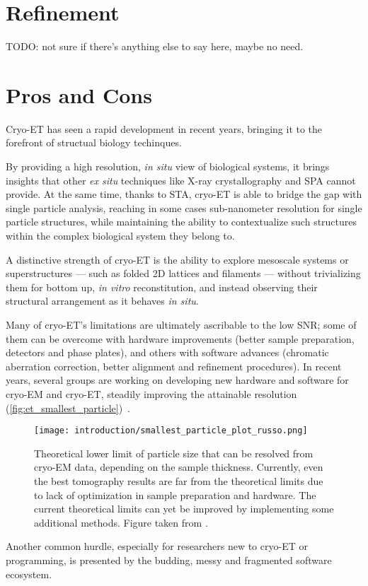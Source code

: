 \section{Refinement}\label{et_refinement}

TODO: not sure if there's anything else to say here, maybe no need.

\section{Pros and Cons}

Cryo-ET has seen a rapid development in recent years, bringing it to the forefront of structual biology techinques.

By providing a high resolution, \textit{in situ} view of biological systems, it brings insights that other \textit{ex situ} techniques like X-ray crystallography and SPA cannot provide.
At the same time, thanks to STA, cryo-ET is able to bridge the gap with single particle analysis, reaching in some cases sub-nanometer resolution for single particle structures, while maintaining the ability to contextualize such structures within the complex biological system they belong to.

A distinctive strength of cryo-ET is the ability to explore mesoscale systems or superstructures --- such as folded 2D lattices and filaments --- without trivializing them for bottom up, \textit{in vitro} reconstitution, and instead observing their structural arrangement as it behaves \textit{in situ}.

Many of cryo-ET's limitations are ultimately ascribable to the low SNR; some of them can be overcome with hardware improvements (better sample preparation, detectors and phase plates), and others with software advances (chromatic aberration correction, better alignment and refinement procedures).
In recent years, several groups are working on developing new hardware and software for cryo-EM and cryo-ET, steadily improving the attainable resolution (\autoref{fig:et_smallest_particle})~\cite{russoCryomicroscopySituWhat2022}.

\begin{figure}[ht]
    \centering
    \texttt{[image: introduction/smallest\_particle\_plot\_russo.png]}
    \caption[Particle size limit vs sample thickness]{Theoretical lower limit of particle size that can be resolved from cryo-EM data, depending on the sample thickness. Currently, even the best tomography results are far from the theoretical limits due to lack of optimization in sample preparation and hardware. The current theoretical limits can yet be improved by implementing some additional methods. Figure taken from \citet{russoElectronCryomicroscopeHardware2023}.}
    \label{fig:et_smallest_particle}
\end{figure}

Another common hurdle, especially for researchers new to cryo-ET or programming, is presented by the budding, messy and fragmented software ecosystem. 
